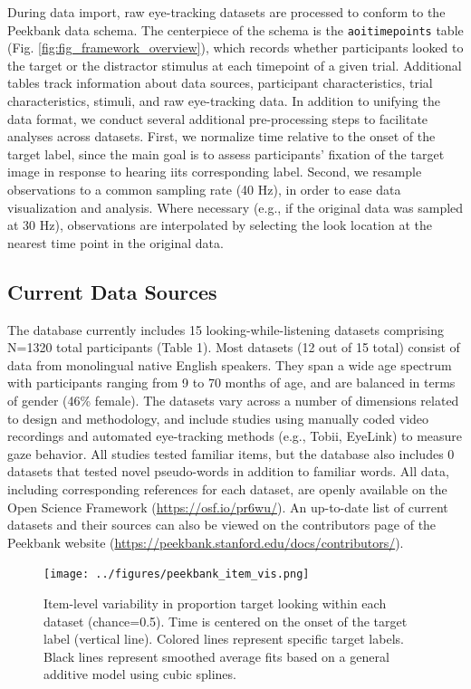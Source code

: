 \documentclass[10pt, letterpaper]{article}
\begin{document}
During data import, raw eye-tracking datasets are processed to conform
to the Peekbank data schema. The centerpiece of the schema is the
\texttt{aoi\textunderscore timepoints} table (Fig.
\ref{fig:fig_framework_overview}), which records whether participants
looked to the target or the distractor stimulus at each timepoint of a
given trial. Additional tables track information about data sources,
participant characteristics, trial characteristics, stimuli, and raw
eye-tracking data. In addition to unifying the data format, we conduct
several additional pre-processing steps to facilitate analyses across
datasets. First, we normalize time relative to the onset of the target
label, since the main goal is to assess participants' fixation of the
target image in response to hearing iits corresponding label. Second, we
resample observations to a common sampling rate (40 Hz), in order to
ease data visualization and analysis. Where necessary (e.g., if the
original data was sampled at 30 Hz), observations are interpolated by
selecting the look location at the nearest time point in the original
data.

\hypertarget{current-data-sources}{%
\subsection{Current Data Sources}\label{current-data-sources}}

The database currently includes 15 looking-while-listening datasets
comprising N=1320 total participants (Table 1). Most datasets (12 out of
15 total) consist of data from monolingual native English speakers. They
span a wide age spectrum with participants ranging from 9 to 70 months
of age, and are balanced in terms of gender (46\% female). The datasets
vary across a number of dimensions related to design and methodology,
and include studies using manually coded video recordings and automated
eye-tracking methods (e.g., Tobii, EyeLink) to measure gaze behavior.
All studies tested familiar items, but the database also includes 0
datasets that tested novel pseudo-words in addition to familiar words.
All data, including corresponding references for each dataset, are
openly available on the Open Science Framework
(\url{https://osf.io/pr6wu/}). An up-to-date list of current datasets
and their sources can also be viewed on the contributors page of the
Peekbank website
(\url{https://peekbank.stanford.edu/docs/contributors/}).

\begin{figure} 
\texttt{[image: ../figures/peekbank\_item\_vis.png]}
\caption{Item-level variability in proportion target looking within each dataset (chance=0.5). Time is centered on the onset of the target label (vertical line). Colored lines represent specific target labels. Black lines represent smoothed average fits based on a general additive model using cubic splines.}
\label{fig:peekbank_item_vis}
\end{figure}
\end{document}
